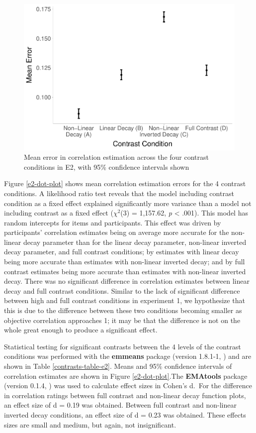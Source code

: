 \documentclass[preprint, 3p,
authoryear]{elsarticle} %
\begin{document}
\begin{figure}

\includegraphics[width=0.5\linewidth]{contrast_and_scatterplots_files/figure-latex/e2-dot-plot-1} \hfill{}

\caption{\label{e2-dot-plot}Mean error in correlation estimation across the four contrast conditions in E2, with 95\% confidence intervals shown}\label{fig:e2-dot-plot}
\end{figure}

Figure \ref{e2-dot-plot} shows mean correlation estimation errors for
the 4 contrast conditions. A likelihood ratio test reveals that the
model including contrast condition as a fixed effect explained
significantly more variance than a model not including contrast as a
fixed effect (\(\chi^2\)(3) = 1,157.62, \emph{p} \textless{} .001). This
model has random intercepts for items and participants. This effect was
driven by participants' correlation estimates being on average more
accurate for the non-linear decay parameter than for the linear decay
parameter, non-linear inverted decay parameter, and full contrast
conditions; by estimates with linear decay being more accurate than
estimates with non-linear inverted decay; and by full contrast estimates
being more accurate than estimates with non-linear inverted decay. There
was no significant difference in correlation estimates between linear
decay and full contrast conditions. Similar to the lack of significant
difference between high and full contrast conditions in experiment 1, we
hypothesize that this is due to the difference between these two
conditions becoming smaller as objective correlation approaches 1; it
may be that the difference is not on the whole great enough to produce a
significant effect.

Statistical testing for significant contrasts between the 4 levels of
the contrast conditions was performed with the \textbf{emmeans} package
(version 1.8.1-1, \citealp{emmeans}) and are shown in Table
\ref{contrasts-table-e2}. Means and 95\% confidence intervals of
correlation estimates are shown in Figure \ref{e2-dot-plot}.The
\textbf{EMAtools} package (version 0.1.4, \citealp{ematools}) was used
to calculate effect sizes in Cohen's d.~For the difference in
correlation ratings between full contrast and non-linear decay function
plots, an effect size of d = 0.19 was obtained. Between full contrast
and non-linear inverted decay conditions, an effect size of d = 0.23 was
obtained. These effects sizes are small and medium, but again, not
insignificant.
\end{document}
